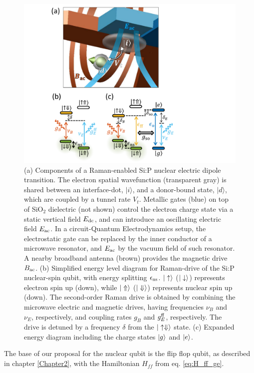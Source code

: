 \begin{figure}
\centering
\includegraphics[width=0.9\columnwidth]{fig1_Raman_v5}
\caption{
		(a) Components of a Raman-enabled Si:P nuclear electric dipole transition. The electron  spatial wavefunction (transparent gray) is shared between an interface-dot, $|i\rangle$, and a donor-bound state, $|d\rangle$, which are coupled by a tunnel rate $V_t$. Metallic gates (blue) on top of SiO$_2$ dielectric (not shown) control the electron charge state via a static vertical field $E_{\rm dc}$, and can introduce an oscillating electric field $E_{\rm ac}$. In a circuit-Quantum Electrodynamics setup, the electrostatic gate can be replaced by the inner conductor of a microwave resonator, and $E_{\rm ac}$ by the vacuum field of such resonator. A nearby broadband antenna \cite{Dehollain2013} (brown) provides the magnetic drive $B_{\rm ac}$. (b) Simplified energy level diagram for Raman-drive of the Si:P nuclear-spin qubit, with energy splitting $\epsilon_{\rm ns}$. $|\uparrow\rangle$ ($|\downarrow\rangle$) represents electron spin up (down), while $|\Uparrow\rangle$ ($|\Downarrow\rangle$) represents nuclear spin up (down). The second-order Raman drive is obtained by combining the microwave electric and magnetic drives, having frequencies $\nu_B$ and $\nu_E$, respectively, and coupling rates $g_B$ and $g_E^{\rm ff}$, respectively. The drive is detuned by a frequency $\delta$ from the $|\uparrow \Downarrow\rangle$ state. (c) Expanded energy diagram including the charge states $|g\rangle$ and $|e\rangle$.
}
\label{fig:Raman}
\end{figure}


The base of our proposal for the nuclear qubit is the flip flop qubit, as described in chapter \ref{Chapter2}, with the Hamiltonian $H_{ff}$ from eq. \eqref{eq:H_ff_ge}. 

